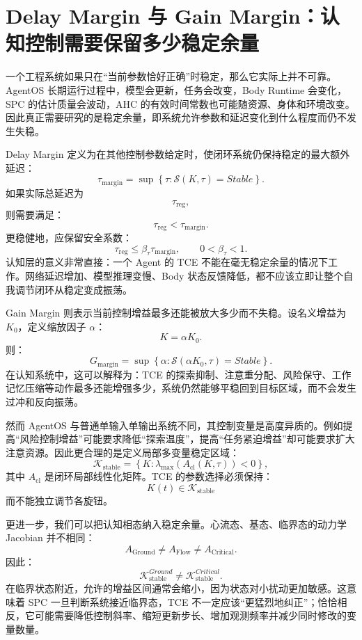 \section{Delay Margin 与 Gain Margin：认知控制需要保留多少稳定余量}

一个工程系统如果只在“当前参数恰好正确”时稳定，那么它实际上并不可靠。AgentOS 长期运行过程中，模型会更新，任务会改变，Body Runtime 会变化，SPC 的估计质量会波动，AHC 的有效时间常数也可能随资源、身体和环境改变。因此真正需要研究的是稳定余量，即系统允许参数和延迟变化到什么程度而仍不发生失稳。

Delay Margin 定义为在其他控制参数给定时，使闭环系统仍保持稳定的最大额外延迟：
\[
\tau_{\mathrm{margin}}
=
\sup
\left\{
\tau:
\mathcal S(K,\tau)=Stable
\right\}.
\]
如果实际总延迟为
\[
\tau_{\mathrm{reg}},
\]
则需要满足：
\[
\tau_{\mathrm{reg}}
<
\tau_{\mathrm{margin}}.
\]
更稳健地，应保留安全系数：
\[
\tau_{\mathrm{reg}}
\le
\beta_\tau
\tau_{\mathrm{margin}},
\qquad
0<\beta_\tau<1.
\]
认知层的意义非常直接：一个 Agent 的 TCE 不能在毫无稳定余量的情况下工作。网络延迟增加、模型推理变慢、Body 状态反馈降低，都不应该立即让整个自我调节闭环从稳定变成振荡。

Gain Margin 则表示当前控制增益最多还能被放大多少而不失稳。设名义增益为 $K_0$，定义缩放因子 $\alpha$：
\[
K=\alpha K_0.
\]
则：
\[
G_{\mathrm{margin}}
=
\sup
\left\{
\alpha:
\mathcal S(\alpha K_0,\tau)=Stable
\right\}.
\]
在认知系统中，这可以解释为：TCE 的探索抑制、注意重分配、风险保守、工作记忆压缩等动作最多还能增强多少，系统仍然能够平稳回到目标区域，而不会发生过冲和反向振荡。

然而 AgentOS 与普通单输入单输出系统不同，其控制变量是高度异质的。例如提高“风险控制增益”可能要求降低“探索温度”，提高“任务紧迫增益”却可能要求扩大注意资源。因此更合理的是定义局部多变量稳定区域：
\[
\mathcal K_{\mathrm{stable}}
=
\left\{
K:
\lambda_{\max}
\left(
A_{\mathrm{cl}}(K,\tau)
\right)
<0
\right\},
\]
其中 $A_{\mathrm{cl}}$ 是闭环局部线性化矩阵。TCE 的参数选择必须保持：
\[
K(t)\in\mathcal K_{\mathrm{stable}}
\]
而不能独立调节各旋钮。

更进一步，我们可以把认知相态纳入稳定余量。心流态、基态、临界态的动力学 Jacobian 并不相同：
\[
A_{\mathrm{Ground}}
\neq
A_{\mathrm{Flow}}
\neq
A_{\mathrm{Critical}}.
\]
因此：
\[
\mathcal K_{\mathrm{stable}}^{Ground}
\neq
\mathcal K_{\mathrm{stable}}^{Critical}.
\]
在临界状态附近，允许的增益区间通常会缩小，因为状态对小扰动更加敏感。这意味着 SPC 一旦判断系统接近临界态，TCE 不一定应该“更猛烈地纠正”；恰恰相反，它可能需要降低控制斜率、缩短更新步长、增加观测频率并减少同时修改的变量数量。

